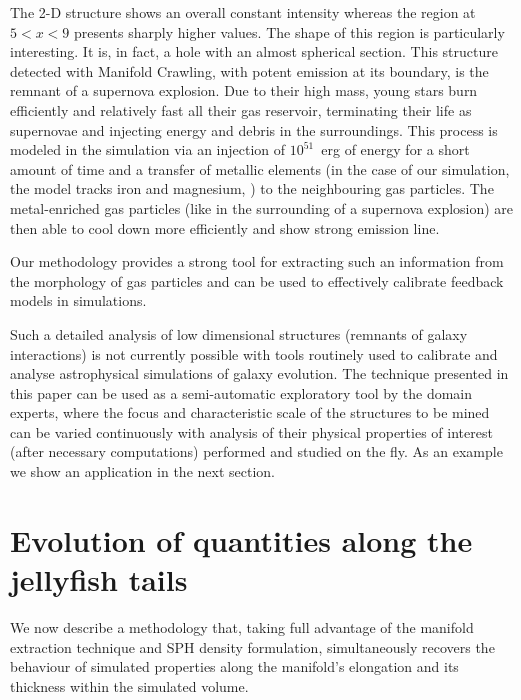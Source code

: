 The 2-D structure shows an overall constant \cii{} intensity whereas the region at $5 < x < 9$ presents sharply higher values.
The shape of this region is particularly interesting. It is, in fact, a hole with an almost spherical section.
This structure detected with Manifold Crawling, with potent \cii{} emission at its boundary, is the remnant of a supernova explosion.
Due to their high mass, young stars burn efficiently and relatively fast all their gas reservoir, terminating their life as supernovae and injecting energy and debris in the surroundings.
This process is modeled in the simulation via an injection of $10^{51}$~erg of energy for a short amount of time and a transfer of metallic elements (in the case of our simulation, the model tracks iron and magnesium, \cite{DeRijcke2013}) to the neighbouring gas particles.
The metal-enriched gas particles (like in the surrounding of a supernova explosion) are then able to cool down more efficiently and show strong \cii{} emission line.

Our methodology provides a strong tool for extracting such an information from the morphology of gas particles and can be used to effectively calibrate feedback models in simulations.

Such a detailed analysis of low dimensional structures (remnants of galaxy interactions) is not currently possible with tools routinely used to calibrate and analyse astrophysical simulations of galaxy evolution.
The technique presented in this paper can be used as a semi-automatic exploratory tool by the domain experts, where the focus and characteristic scale of the structures to be mined can be varied continuously with analysis of their physical properties of interest (after necessary computations) performed and studied on the fly.
As an example we show an application in the next section.

\section{Evolution of quantities along the jellyfish tails}


We now describe a methodology that, taking full advantage of the manifold extraction technique and SPH density formulation, simultaneously recovers the behaviour of simulated properties along the manifold's elongation and its thickness within the simulated volume.


